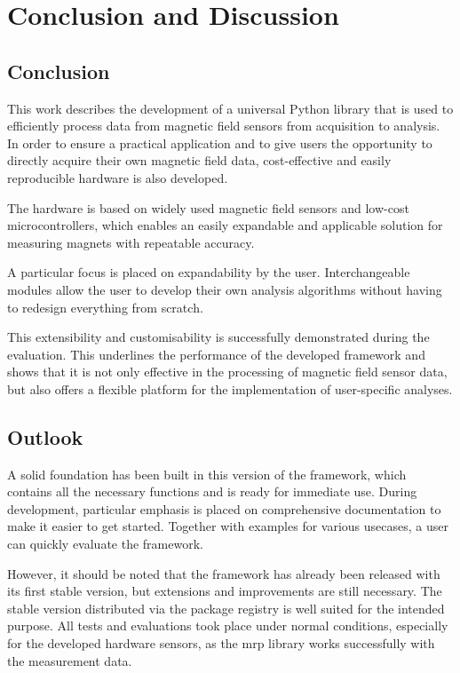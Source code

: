 \hypertarget{conclusion-and-discussion}{%
\chapter{Conclusion and Discussion}\label{conclusion-and-discussion}}

\hypertarget{conclusion}{%
\section{Conclusion}\label{conclusion}}

This work describes the development of a universal Python library that
is used to efficiently process data from magnetic field sensors from
acquisition to analysis. In order to ensure a practical application and
to give users the opportunity to directly acquire their own magnetic
field data, cost-effective and easily reproducible hardware is also
developed.

The hardware is based on widely used magnetic field sensors and low-cost
microcontrollers, which enables an easily expandable and applicable
solution for measuring magnets with repeatable accuracy.

A particular focus is placed on expandability by the user.
Interchangeable modules allow the user to develop their own analysis
algorithms without having to redesign everything from scratch.

This extensibility and customisability is successfully demonstrated
during the evaluation. This underlines the performance of the developed
framework and shows that it is not only effective in the processing of
magnetic field sensor data, but also offers a flexible platform for the
implementation of user-specific analyses.

\hypertarget{outlook}{%
\section{Outlook}\label{outlook}}

A solid foundation has been built in this version of the framework,
which contains all the necessary functions and is ready for immediate
use. During development, particular emphasis is placed on comprehensive
documentation to make it easier to get started. Together with examples
for various usecases, a user can quickly evaluate the framework.

However, it should be noted that the framework has already been released
with its first stable version, but extensions and improvements are still
necessary. The stable version distributed via the package registry is
well suited for the intended purpose. All tests and evaluations took
place under normal conditions, especially for the developed hardware
sensors, as the \gls{mrp} library works successfully with the
measurement data.


